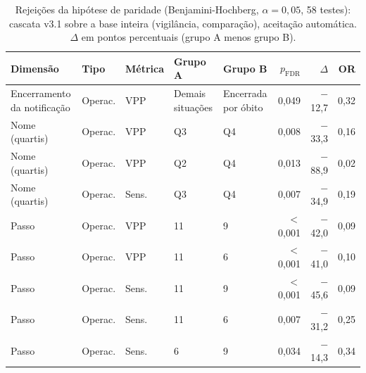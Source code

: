 \begin{table}[htbp]
\centering
\caption{Rejeições da hipótese de paridade (Benjamini-Hochberg, $\alpha=0{,}05$, 58 testes): cascata v3.1 sobre a base inteira (vigilância, comparação), aceitação automática. $\Delta$ em pontos percentuais (grupo A menos grupo B).}
\label{tab:equidade-v31-rejeicoes-cascata}
\footnotesize\setlength{\tabcolsep}{3pt}
\begin{tabular}{lllllrrr}
\toprule
Dimens\~ao & Tipo & M\'etrica & Grupo A & Grupo B & $p_{\mathrm{FDR}}$ & $\Delta$ & OR \\
\midrule
Encerramento da notifica\c{c}\~ao & Operac. & VPP & Demais situa\c{c}\~oes & Encerrada por \'obito & 0{,}049 & $-$12{,}7 & 0{,}32 \\
Nome (quartis) & Operac. & VPP & Q3 & Q4 & 0{,}008 & $-$33{,}3 & 0{,}16 \\
Nome (quartis) & Operac. & VPP & Q2 & Q4 & 0{,}013 & $-$88{,}9 & 0{,}02 \\
Nome (quartis) & Operac. & Sens. & Q3 & Q4 & 0{,}007 & $-$34{,}9 & 0{,}19 \\
Passo & Operac. & VPP & 11 & 9 & $<$0{,}001 & $-$42{,}0 & 0{,}09 \\
Passo & Operac. & VPP & 11 & 6 & $<$0{,}001 & $-$41{,}0 & 0{,}10 \\
Passo & Operac. & Sens. & 11 & 9 & $<$0{,}001 & $-$45{,}6 & 0{,}09 \\
Passo & Operac. & Sens. & 11 & 6 & 0{,}007 & $-$31{,}2 & 0{,}25 \\
Passo & Operac. & Sens. & 6 & 9 & 0{,}034 & $-$14{,}3 & 0{,}34 \\
\bottomrule
\end{tabular}
\end{table}
